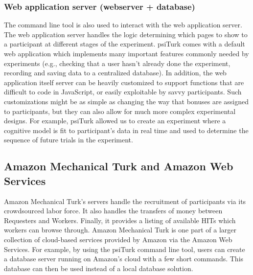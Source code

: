 \documentclass[twocolumn]{svjour3}          %
\newcommand{\psiturk}[0]{\textsf{psiTurk}}
\begin{document}
\subsubsection{Web application server (webserver + database)}

The command line tool is also used to interact with the web application server.
The web application server handles the logic determining which pages to show
to a participant at different stages of the experiment.  \psiturk{} comes with
a default web application which implements many important features commonly
needed by experiments (e.g., checking that a user hasn't already done the experiment,
recording and saving data to a centralized database).  In addition, the web application itself
server can be heavily customized to support functions that are difficult to code in JavaScript,
or easily exploitable by savvy participants. Such customizations might be as simple as changing
the way that bonuses are assigned to participants, but they can also allow for much
more complex experimental designs. For example, \psiturk{} allowed us to create an
experiment where a cognitive model is fit to participant's data in real time and used to determine the sequence of future
trials in the experiment.

\subsection{Amazon Mechanical Turk and Amazon Web Services}

Amazon Mechanical Turk's servers handle the recruitment of participants via
its crowdsourced labor force.  It also handles the transfers of money between Requesters and
Workers.  Finally, it provides a listing of available HITs which workers can browse 
through.  Amazon Mechanical Turk is one part of a larger collection
of cloud-based services provided by Amazon via the Amazon Web Services.
For example, by using the \psiturk{} command line tool, users can create a
database server running on Amazon's cloud with a few short commands.  This database
can then be used instead of a local database solution.
\end{document}
